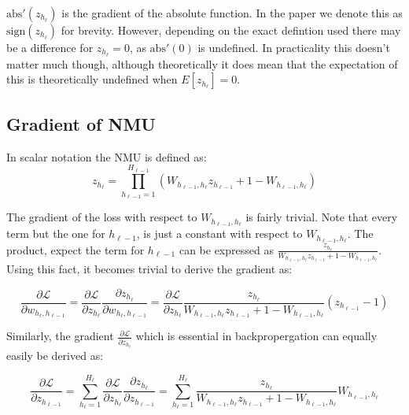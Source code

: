 $\mathrm{abs}'(z_{h_{\ell}})$ is the gradient of the absolute function. In the paper we denote this as $\mathrm{sign}(z_{h_{\ell}})$ for brevity. However, depending on the exact defintion used there may be a difference for $z_{h_{\ell}} = 0$, as $\mathrm{abs}'(0)$ is undefined. In practicality this doesn't matter much though, although theoretically it does mean that the expectation of this is theoretically undefined when $E[z_{h_{\ell}}] = 0$.

\subsection{Gradient of NMU}

In scalar notation the NMU is defined as:
\begin{equation}
z_{h_\ell} = \prod_{h_{\ell-1}=1}^{H_{\ell-1}} \left(W_{h_{\ell-1},h_\ell} z_{h_{\ell-1}} + 1 - W_{h_{\ell-1},h_\ell} \right)
\end{equation}

The gradient of the loss with respect to $W_{h_{\ell-1},h_\ell}$ is fairly trivial. Note that every term but the one for $h_{\ell-1}$, is just a constant with respect to $W_{h_{\ell-1},h_\ell}$. The product, expect the term for $h_{\ell-1}$ can be expressed as $\frac{z_{h_\ell}}{W_{h_{\ell-1},h_\ell} z_{h_{\ell-1}} + 1 - W_{h_{\ell-1},h_\ell}}$. Using this fact, it becomes trivial to derive the gradient as:

\begin{equation}
\frac{\partial \mathcal{L}}{\partial w_{h_{\ell}, h_{\ell - 1}}} = \frac{\partial \mathcal{L}}{\partial z_{h_\ell}} \frac{\partial z_{h_\ell}}{\partial w_{h_{\ell}, h_{\ell - 1}}} = \frac{\partial \mathcal{L}}{\partial z_{h_\ell}} \frac{z_{h_\ell}}{W_{h_{\ell-1},h_\ell} z_{h_{\ell-1}} + 1 - W_{h_{\ell-1},h_\ell}} \left(z_{h_{\ell-1}} - 1\right)
\end{equation}

Similarly, the gradient $\frac{\partial \mathcal{L}}{\partial z_{h_\ell}}$ which is essential in backpropergation can equally easily be derived as:

\begin{equation}
\frac{\partial \mathcal{L}}{\partial z_{h_{\ell-1}}} = \sum_{h_\ell = 1}^{H_\ell} \frac{\partial \mathcal{L}}{\partial z_{h_\ell}} \frac{\partial z_{h_\ell}}{\partial z_{h_{\ell-1}}} = \sum_{h_\ell = 1}^{H_\ell} \frac{z_{h_\ell}}{W_{h_{\ell-1},h_\ell} z_{h_{\ell-1}} + 1 - W_{h_{\ell-1},h_\ell}} W_{h_{\ell-1},h_\ell}
\end{equation}
